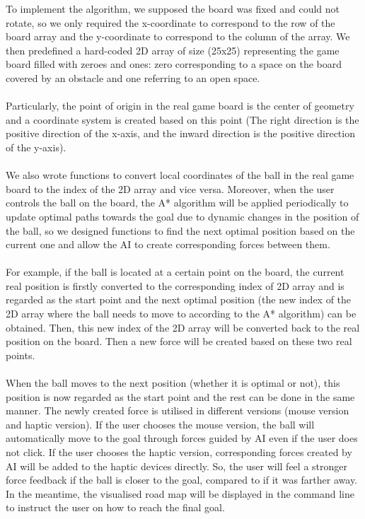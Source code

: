 \documentclass[a4paper]{article}
\begin{document}
To implement the algorithm, we supposed the board was fixed and could not rotate, so we only required the x-coordinate to correspond to the row of the board array and the y-coordinate to correspond to the column of the array. We then predefined a hard-coded 2D array of size (25x25) representing the game board filled with zeroes and ones: zero corresponding to a space on the board covered by an obstacle and one referring to an open space. \\ \\Particularly, the point of origin in the real game board is the center of geometry and a coordinate system is created based on this point (The right direction is the positive direction of the x-axis, and the inward direction is the positive direction of the y-axis). \\ \\We also wrote functions to convert local coordinates of the ball in the real game board to the index of the 2D array and vice versa. Moreover, when the user controls the ball on the board, the A* algorithm will be applied periodically to update optimal paths towards the goal due to dynamic changes in the position of the ball, so we designed functions to find the next optimal position based on the current one and allow the AI to create corresponding forces between them. \\ \\For example, if the ball is located at a certain point on the board, the current real position is firstly converted to the corresponding index of 2D array and is regarded as the start point and the next optimal position (the new index of the 2D array where the ball needs to move to according to the A* algorithm) can be obtained. Then, this new index of the 2D array will be converted back to the real position on the board. Then a new force will be created based on these two real points. \\ \\When the ball moves to the next position (whether it is optimal or not), this position is now regarded as the start point and the rest can be done in the same manner. The newly created force is utilised in different versions (mouse version and haptic version). If the user chooses the mouse version, the ball will automatically move to the goal through forces guided by AI even if the user does not click. If the user chooses the haptic version, corresponding forces created by AI will be added to the haptic devices directly. So, the user will feel a stronger force feedback if the ball is closer to the goal, compared to if it was farther away. In the meantime, the visualised road map will be displayed in the command line to instruct the user on how to reach the final goal.
\end{document}
